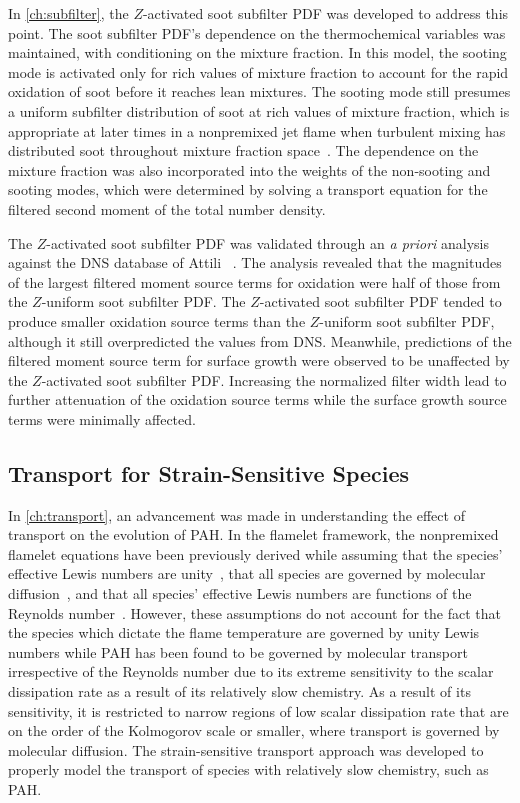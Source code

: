 In \cref{ch:subfilter}, the $Z$-activated soot subfilter PDF was developed to address this point. The soot subfilter PDF's dependence on the thermochemical variables was maintained, with conditioning on the mixture fraction. In this model, the sooting mode is activated only for rich values of mixture fraction to account for the rapid oxidation of soot before it reaches lean mixtures. The sooting mode still presumes a uniform subfilter distribution of soot at rich values of mixture fraction, which is appropriate at later times in a nonpremixed jet flame when turbulent mixing has distributed soot throughout mixture fraction space~\cite{attili2014}. The dependence on the mixture fraction was also incorporated into the weights of the non-sooting and sooting modes, which were determined by solving a transport equation for the filtered second moment of the total number density.

The $Z$-activated soot subfilter PDF was validated through an \textit{a priori} analysis against the DNS database of Attili \etal~\cite{attili2014}. The analysis revealed that the magnitudes of the largest filtered moment source terms for oxidation were half of those from the $Z$-uniform soot subfilter PDF. The $Z$-activated soot subfilter PDF tended to produce smaller oxidation source terms than the $Z$-uniform soot subfilter PDF, although it still overpredicted the values from DNS. Meanwhile, predictions of the filtered moment source term for surface growth were observed to be unaffected by the $Z$-activated soot subfilter PDF. Increasing the normalized filter width lead to further attenuation of the oxidation source terms while the surface growth source terms were minimally affected.

\subsection{Transport for Strain-Sensitive Species}
\label{sec:conclusion:contributions:transport}

In \cref{ch:transport}, an advancement was made in understanding the effect of transport on the evolution of PAH. In the flamelet framework, the nonpremixed flamelet equations have been previously derived while assuming that the species' effective Lewis numbers are unity~\cite{peters1984}, that all species are governed by molecular diffusion~\cite{pitsch1998}, and that all species' effective Lewis numbers are functions of the Reynolds number~\cite{wang2016}. However, these assumptions do not account for the fact that the species which dictate the flame temperature are governed by unity Lewis numbers while PAH has been found to be governed by molecular transport irrespective of the Reynolds number due to its extreme sensitivity to the scalar dissipation rate as a result of its relatively slow chemistry. As a result of its sensitivity, it is restricted to narrow regions of low scalar dissipation rate that are on the order of the Kolmogorov scale or smaller, where transport is governed by molecular diffusion. The strain-sensitive transport approach was developed to properly model the transport of species with relatively slow chemistry, such as PAH.

